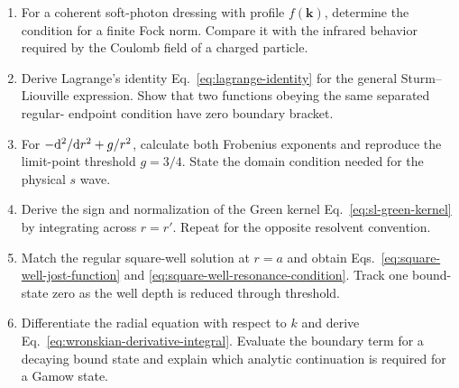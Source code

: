 \begin{enumerate}[label=\textbf{II.\arabic*},leftmargin=*]
  \item For a coherent soft-photon dressing with profile $f(\bm k)$, determine
  the condition for a finite Fock norm.  Compare it with the infrared behavior
  required by the Coulomb field of a charged particle.

  \item Derive Lagrange's identity
  Eq.~\eqref{eq:lagrange-identity} for the general Sturm--Liouville
  expression.  Show that two functions obeying the same separated regular-
  endpoint condition have zero boundary bracket.

  \item For $-\mathrm{d}^2/\mathrm{d} r^2+g/r^2$, calculate both Frobenius exponents and
  reproduce the limit-point threshold $g=3/4$.  State the domain condition
  needed for the physical $s$ wave.

  \item Derive the sign and normalization of the Green kernel
  Eq.~\eqref{eq:sl-green-kernel} by integrating across $r=r'$.  Repeat for
  the opposite resolvent convention.

  \item Match the regular square-well solution at $r=a$ and obtain
  Eqs.~\eqref{eq:square-well-jost-function} and
  \eqref{eq:square-well-resonance-condition}.  Track one bound-state zero as
  the well depth is reduced through threshold.

  \item Differentiate the radial equation with respect to $k$ and derive
  Eq.~\eqref{eq:wronskian-derivative-integral}.  Evaluate the boundary term
  for a decaying bound state and explain which analytic continuation is
  required for a Gamow state.
\end{enumerate}
